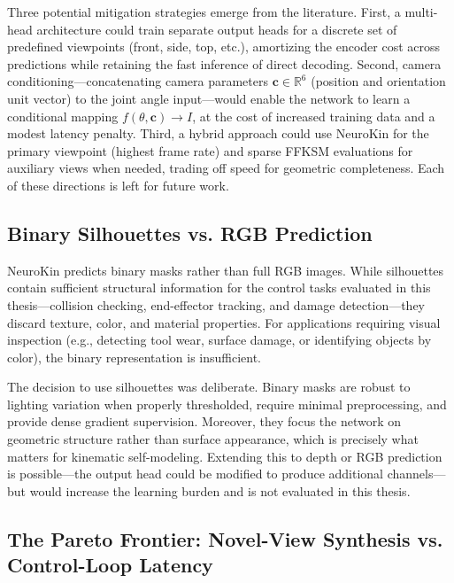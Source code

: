 \documentclass[12pt,a4paper,oneside]{report}
\begin{document}
Three potential mitigation strategies emerge from the literature. First, a multi-head architecture could train separate output heads for a discrete set of predefined viewpoints (front, side, top, etc.), amortizing the encoder cost across predictions while retaining the fast inference of direct decoding. Second, camera conditioning—concatenating camera parameters $\mathbf{c} \in \mathbb{R}^6$ (position and orientation unit vector) to the joint angle input—would enable the network to learn a conditional mapping $f(\theta, \mathbf{c}) \rightarrow I$, at the cost of increased training data and a modest latency penalty. Third, a hybrid approach could use NeuroKin for the primary viewpoint (highest frame rate) and sparse FFKSM evaluations for auxiliary views when needed, trading off speed for geometric completeness. Each of these directions is left for future work.

\subsection{Binary Silhouettes vs. RGB Prediction}
\label{subsec:binary_silhouettes_vs_rgb_prediction}

NeuroKin predicts binary masks rather than full RGB images. While silhouettes contain sufficient structural information for the control tasks evaluated in this thesis—collision checking, end-effector tracking, and damage detection—they discard texture, color, and material properties. For applications requiring visual inspection (e.g., detecting tool wear, surface damage, or identifying objects by color), the binary representation is insufficient.

The decision to use silhouettes was deliberate. Binary masks are robust to lighting variation when properly thresholded, require minimal preprocessing, and provide dense gradient supervision. Moreover, they focus the network on geometric structure rather than surface appearance, which is precisely what matters for kinematic self-modeling. Extending this to depth or RGB prediction is possible—the output head could be modified to produce additional channels—but would increase the learning burden and is not evaluated in this thesis.

\subsection{The Pareto Frontier: Novel-View Synthesis vs. Control-Loop Latency}
\label{subsec:the_pareto_frontier_novel_view_synthesis_vs_control_loop_latency}
\end{document}
